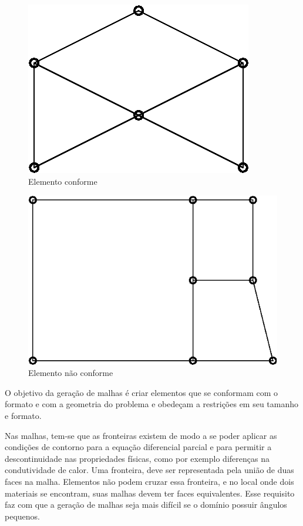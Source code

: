 \begin{figure}
    \centering
    \includegraphics{fig/celula_correta.eps}
    \caption[Elemento conforme]{Elemento conforme}
    \label{fig:celula_correta}
\end{figure}


\begin{figure}
    \centering
    \includegraphics{fig/celula_errada.eps}
    \caption[Elemento não conforme]{Elemento não conforme}
    \label{fig:celula_errada}
\end{figure}

O objetivo da geração de malhas é criar elementos que se conformam com o formato e com a geometria do problema e obedeçam a restrições em seu tamanho e formato.

Nas malhas, tem-se que as fronteiras existem de modo a se poder aplicar as condições de contorno para a equação diferencial parcial e para permitir a descontinuidade nas propriedades físicas, como por exemplo diferenças na condutividade de calor. Uma fronteira, deve ser representada pela união de duas faces na malha. Elementos não podem cruzar essa fronteira, e no local onde dois materiais se encontram, suas malhas devem ter faces equivalentes. Esse requisito faz com que a geração de malhas seja mais difícil se o domínio possuir ângulos pequenos.

